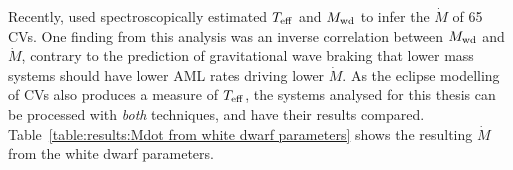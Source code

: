 Recently, \citet{Pala2021} used spectroscopically estimated $T_{\rm eff}$ and $M_{\rm wd}$ to infer the $\dot M$ of 65 CVs. %
One finding from this analysis was an inverse correlation between $M_{\rm wd}$ and $\dot M$, contrary to the prediction of gravitational wave braking that lower mass systems should have lower AML rates driving lower $\dot M$.
As the eclipse modelling of CVs also produces a measure of $T_{\rm eff}$, the systems analysed for this thesis can be processed with {\it both} techniques, and have their results compared. Table~\ref{table:results:Mdot from white dwarf parameters} shows the resulting $\dot M$ from the white dwarf parameters.



